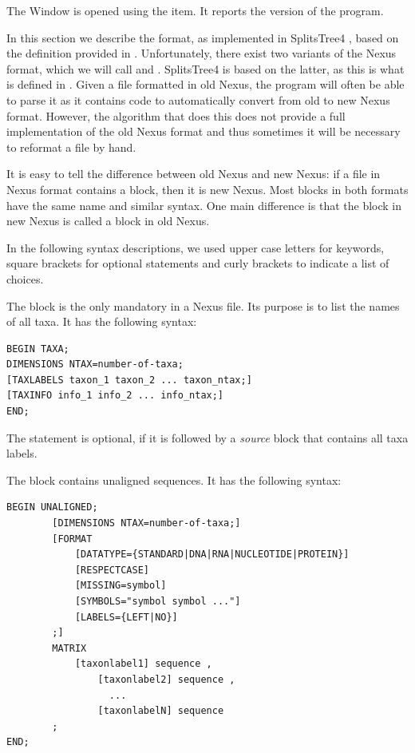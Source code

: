 \documentclass[11pt]{article}
\def\SplitsTree{{\sf SplitsTree4 }}
\begin{document}

The  Window is opened using the
 item. It reports the version of the program.



In this section we describe the  format, as implemented in
\SplitsTree, based on the definition provided in \cite{NEXUS}.
Unfortunately, there exist two variants of the Nexus format,
which we will call  and .
\SplitsTree is based on the latter, as this is what is defined in
\cite{NEXUS}. Given a file formatted in old Nexus,
the program will often be able to parse it as it contains code to
automatically convert from old to new Nexus format.
However, the algorithm that does this does not provide a full
implementation
of the old Nexus format and thus sometimes it will be necessary to
reformat a file by hand.

It is easy to tell the difference between old Nexus and new Nexus:
if a file in Nexus format contains a  block, then it is
new Nexus. Most blocks in both formats have the same name and similar
syntax. One main difference is that the  block
in new Nexus is called a  block in old Nexus.

In the following syntax descriptions, we used upper case letters for
keywords, square brackets for optional statements and curly brackets
to indicate a list of choices.


The  block is the only mandatory  in a Nexus file.
Its purpose is to list the names of all taxa. It has the following
syntax:

\begin{verbatim}
BEGIN TAXA;
DIMENSIONS NTAX=number-of-taxa;
[TAXLABELS taxon_1 taxon_2 ... taxon_ntax;]
[TAXINFO info_1 info_2 ... info_ntax;]
END;
\end{verbatim}

The  statement is optional, if it is followed
by a {\em source} block that contains all taxa labels.


The  block contains unaligned sequences.
It has the following syntax:
\begin{verbatim}
BEGIN UNALIGNED;
        [DIMENSIONS NTAX=number-of-taxa;]
        [FORMAT
            [DATATYPE={STANDARD|DNA|RNA|NUCLEOTIDE|PROTEIN}]
            [RESPECTCASE]
            [MISSING=symbol]
            [SYMBOLS="symbol symbol ..."]
            [LABELS={LEFT|NO}]
        ;]
        MATRIX
            [taxonlabel1] sequence ,
                [taxonlabel2] sequence ,
                  ...
                [taxonlabelN] sequence
        ;
END;
\end{verbatim}
\end{document}
